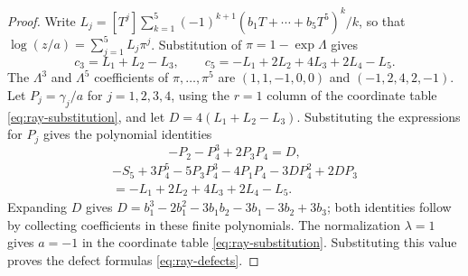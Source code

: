 \documentclass[11pt]{amsart}
\theoremstyle{plain}
\theoremstyle{definition}
\numberwithin{equation}{section}
\begin{document}
\begin{proof}
Write
$L_j=[T^j]\sum_{k=1}^5(-1)^{k+1}(b_1T+\cdots+b_5T^5)^k/k$,
so that $\log(z/a)=\sum_{j=1}^5L_j\pi^j$.
Substitution of $\pi=1-\exp\Lambda$ gives
\begin{equation}\label{eq:log-coordinate-conversion}
 c_3=L_1+L_2-L_3,\qquad
 c_5=-L_1+2L_2+4L_3+2L_4-L_5.
\end{equation}
The $\Lambda^3$ and $\Lambda^5$ coefficients of
$\pi,\ldots,\pi^5$ are $(1,1,-1,0,0)$ and $(-1,2,4,2,-1)$.
Let $P_j=\gamma_j/a$ for $j=1,2,3,4$, using the $r=1$ column of
the coordinate table \eqref{eq:ray-substitution}, and let
$D=4(L_1+L_2-L_3)$.
Substituting the expressions for $P_j$ gives the polynomial identities
\[
 -P_2-P_4^3+2P_3P_4=D,
\]
\begin{multline*}
 -S_5+3P_4^5-5P_3P_4^3-4P_1P_4-3DP_4^2+2DP_3\\
 =-L_1+2L_2+4L_3+2L_4-L_5.
\end{multline*}
Expanding $D$ gives
$D=b_1^3-2b_1^2-3b_1b_2-3b_1-3b_2+3b_3$; both identities
follow by collecting coefficients in these finite polynomials.
The normalization $\lambda=1$ gives $a=-1$ in the coordinate table
\eqref{eq:ray-substitution}.
Substituting this value proves the defect formulas \eqref{eq:ray-defects}.
\end{proof}
\end{document}
